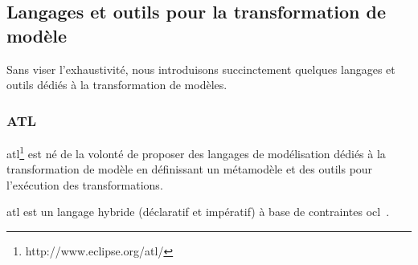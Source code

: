 	\subsection{Langages et outils pour la transformation de modèle}
Sans viser l'exhaustivité, nous introduisons succinctement quelques langages et outils 
dédiés à la transformation de modèles.  

\subsubsection{ATL}
\label{sec:ATL}
\gls{atl}\footnote{http://www.eclipse.org/atl/} est né de la volonté de proposer des langages de modélisation dédiés à la transformation de modèle en définissant un métamodèle 
et des outils pour l'exécution des transformations. 

\gls{atl} est un langage hybride (déclaratif et impératif) à base de contraintes \gls{ocl}~\cite{jouault2006transforming}. 

%


